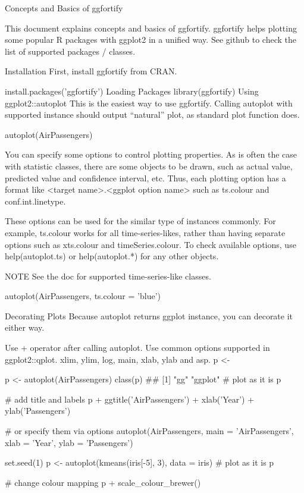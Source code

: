 Concepts and Basics of ggfortify


This document explains concepts and basics of ggfortify. ggfortify helps plotting some popular R packages with ggplot2 in a unified way. See github to check the list of supported packages / classes.

Installation
First, install ggfortify from CRAN.

install.packages('ggfortify')
Loading Packages
library(ggfortify)
Using ggplot2::autoplot
This is the easiest way to use ggfortify. Calling autoplot with supported instance should output “natural” plot, as standard plot function does.

autoplot(AirPassengers)


You can specify some options to control plotting properties. As is often the case with statistic classes, there are some objects to be drawn, such as actual value, predicted value and confidence interval, etc. Thus, each plotting option has a format like <target name>.<ggplot option name> such as ts.colour and conf.int.linetype.

These options can be used for the similar type of instances commonly. For example, ts.colour works for all time-series-likes, rather than having separate options such as xts.colour and timeSeries.colour. To check available options, use help(autoplot.ts) or  help(autoplot.*) for any other objects.

NOTE See the doc for supported time-series-like classes.

autoplot(AirPassengers, ts.colour = 'blue')


Decorating Plots
Because autoplot returns ggplot instance, you can decorate it either way.

Use + operator after calling autoplot.
Use common options supported in ggplot2::qplot. xlim, ylim, log, main, xlab, ylab and asp.
p <- 

p <- autoplot(AirPassengers)
class(p)
## [1] "gg"     "ggplot"
# plot as it is
p


# add title and labels
p + ggtitle('AirPassengers') + xlab('Year') + ylab('Passengers')


# or specify them via options
autoplot(AirPassengers, main = 'AirPassengers', xlab = 'Year', ylab = 'Passengers')


set.seed(1)
p <- autoplot(kmeans(iris[-5], 3), data = iris)
# plot as it is
p


# change colour mapping
p + scale_colour_brewer()


